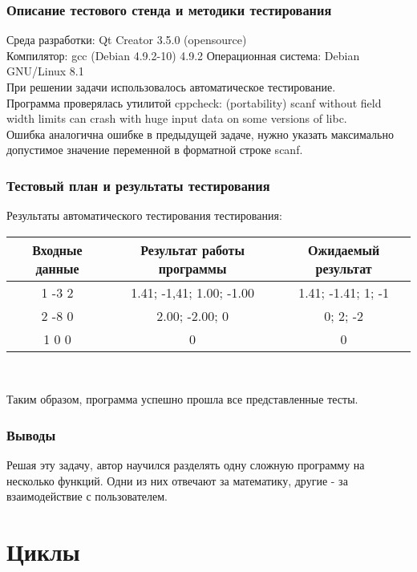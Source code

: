 \documentclass[12pt,a4paper]{report}
\begin{document}
\subsection{Описание тестового стенда и методики тестирования}
Среда разработки: Qt Creator 3.5.0 (opensource)\\
Компилятор: gcc (Debian 4.9.2-10) 4.9.2
Операционная система: Debian GNU/Linux 8.1 \\
При решении задачи использовалось автоматическое тестирование.\\
Программа проверялась утилитой cppcheck: (portability) scanf without field width limits can crash with huge input data on some versions of libc.\\
Ошибка аналогична ошибке в предыдущей задаче, нужно указать максимально допустимое значение переменной в форматной строке scanf. 
\subsection{Тестовый план и результаты тестирования}
\begin{center}
Результаты автоматического тестирования тестирования:
\end{center}
\begin{tabular}{|c|c|c|} 
\hline
Входные данные & Результат работы программы & Ожидаемый результат \\
\hline
1 -3 2 & 1.41; -1,41; 1.00; -1.00 & 1.41; -1.41; 1; -1 \\
\hline
2 -8 0 & 2.00; -2.00; 0 & 0; 2; -2 \\
\hline 
1 0 0 & 0 & 0 \\
\hline
\end{tabular} 
\\
\begin{center}
Таким образом, программа успешно прошла все представленные тесты. 
\end{center}

\subsection{Выводы}
Решая эту задачу, автор научился разделять одну сложную программу на несколько функций. Одни из них отвечают за математику, другие - за взаимодействие с пользователем. 
\chapter{Циклы}
\end{document}
